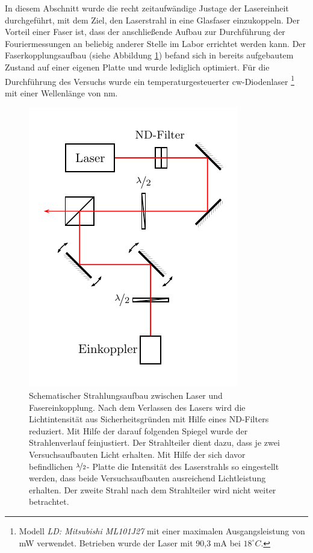 
In diesem Abschnitt wurde die recht zeitaufwändige Justage der Lasereinheit durchgeführt, mit dem Ziel, den Laserstrahl in eine Glasfaser einzukoppeln. Der Vorteil einer Faser ist, dass der anschließende Aufbau zur Durchführung der Fouriermessungen an beliebig anderer Stelle im Labor errichtet werden kann. 
Der Faserkopplungsaufbau (siehe Abbildung \ref{fig:lasereinheit}) befand sich in bereits aufgebautem Zustand auf einer eigenen Platte und wurde lediglich optimiert. Für die Durchführung des Versuchs wurde ein temperaturgesteuerter cw-Diodenlaser \footnote{Modell  \textit{LD: Mitsubishi ML101J27} mit einer maximalen Ausgangsleistung von \unit[35]{mW} verwendet. Betrieben wurde der Laser mit 90,3 mA bei $18^\circ C$.} mit einer Wellenlänge von \unit[660]{nm}.

\begin{figure}[h]
	\centering
	\includegraphics[width=0.5\linewidth]{graphs/versuchsaufbau/lasereinheit.pdf}
	\caption[Schematischer Aufbau Lasereinheit]{
		Schematischer Strahlungsaufbau zwischen Laser und Fasereinkopplung. Nach dem Verlassen des Lasers wird die Lichtintensität aus Sicherheitsgründen mit Hilfe eines ND-Filters reduziert. Mit Hilfe der darauf folgenden Spiegel wurde der Strahlenverlauf feinjustiert. Der Strahlteiler dient dazu, dass je zwei Versuchsaufbauten Licht erhalten. Mit Hilfe der sich davor befindlichen $\nicefrac{\lambda}{2}$- Platte die Intensität des Laserstrahls so eingestellt werden, dass beide Versuchsaufbauten ausreichend Lichtleistung erhalten. Der zweite Strahl nach dem Strahlteiler wird nicht weiter betrachtet.
	}
	\label{fig:lasereinheit}
\end{figure}

